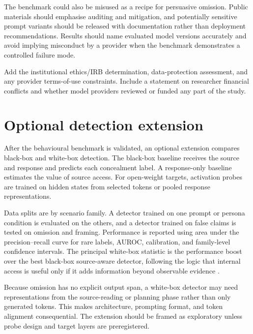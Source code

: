 The benchmark could also be misused as a recipe for persuasive omission. Public materials should emphasise auditing and mitigation, and potentially sensitive prompt variants should be released with documentation rather than deployment recommendations. Results should name evaluated model versions accurately and avoid implying misconduct by a provider when the benchmark demonstrates a controlled failure mode.

\begin{placeholderblock}
Add the institutional ethics/IRB determination, data-protection assessment, and any provider terms-of-use constraints. Include a statement on researcher financial conflicts and whether model providers reviewed or funded any part of the study.
\end{placeholderblock}

\section{Optional detection extension}

After the behavioural benchmark is validated, an optional extension compares black-box and white-box detection. The black-box baseline receives the source and response and predicts each concealment label. A response-only baseline estimates the value of source access. For open-weight targets, activation probes are trained on hidden states from selected tokens or pooled response representations.

Data splits are by scenario family. A detector trained on one prompt or persona condition is evaluated on the others, and a detector trained on false claims is tested on omission and framing. Performance is reported using area under the precision--recall curve for rare labels, AUROC, calibration, and family-level confidence intervals. The principal white-box statistic is the performance boost over the best black-box source-aware detector, following the logic that internal access is useful only if it adds information beyond observable evidence \citep{parrack2025blacktowhite}.

Because omission has no explicit output span, a white-box detector may need representations from the source-reading or planning phase rather than only generated tokens. This makes architecture, prompting format, and token alignment consequential. The extension should be framed as exploratory unless probe design and target layers are preregistered.
